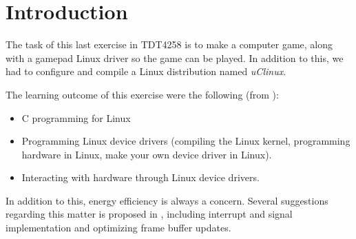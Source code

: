 \section{Introduction}
The task of this last exercise in TDT4258 is to make a computer game, along with a gamepad Linux driver so the game can be played. In addition to this, we had to configure and compile a Linux distribution named \emph{uClinux}. 

The learning outcome of this exercise were the following (from \cite{compendium}):
\begin{itemize}
	\item C programming for Linux
	\item Programming Linux device drivers (compiling the Linux kernel, programming hardware in Linux, make your own device driver in Linux).
	\item Interacting with hardware through Linux device drivers.
\end{itemize}

In addition to this, energy efficiency is always a concern. Several suggestions regarding this matter is proposed in \cite{compendium}, including interrupt and signal implementation and optimizing frame buffer updates.
